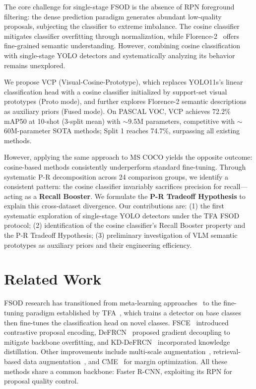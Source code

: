 \documentclass[conference]{IEEEtran}
\begin{document}
The core challenge for single-stage FSOD is the absence of RPN foreground filtering: the dense prediction paradigm generates abundant low-quality proposals, subjecting the classifier to extreme imbalance. The cosine classifier~\cite{wang2020tfa} mitigates classifier overfitting through normalization, while Florence-2~\cite{xiao2024florence2} offers fine-grained semantic understanding. However, combining cosine classification with single-stage YOLO detectors and systematically analyzing its behavior remains unexplored.

We propose VCP (Visual-Cosine-Prototype), which replaces YOLO11s's linear classification head with a cosine classifier initialized by support-set visual prototypes (Proto mode), and further explores Florence-2 semantic descriptions as auxiliary priors (Fused mode). On PASCAL VOC, VCP achieves 72.2\% mAP50 at 10-shot (3-split mean) with $\sim$9.5M parameters, competitive with $\sim$60M-parameter SOTA methods; Split 1 reaches 74.7\%, surpassing all existing methods.

However, applying the same approach to MS COCO yields the opposite outcome: cosine-based methods consistently underperform standard fine-tuning. Through systematic P-R decomposition across 24 comparison groups, we identify a consistent pattern: the cosine classifier invariably sacrifices precision for recall---acting as a \textbf{Recall Booster}. We formulate the \textbf{P-R Tradeoff Hypothesis} to explain this cross-dataset divergence. Our contributions are: (1) the first systematic exploration of single-stage YOLO detectors under the TFA FSOD protocol; (2) identification of the cosine classifier's Recall Booster property and the P-R Tradeoff Hypothesis; (3) preliminary investigation of VLM semantic prototypes as auxiliary priors and their engineering efficiency.

\section{Related Work}

FSOD research has transitioned from meta-learning approaches~\hl{\cite{huang2025prototype,gao2025decoupling}} to the fine-tuning paradigm established by TFA~\cite{wang2020tfa}, which trains a detector on base classes then fine-tunes the classification head on novel classes. FSCE~\cite{sun2021fsce} introduced contrastive proposal encoding, DeFRCN~\cite{qiao2021defrcn} proposed gradient decoupling to mitigate backbone overfitting, and KD-DeFRCN~\cite{pei2022kddefrcn} incorporated knowledge distillation. Other improvements include multi-scale augmentation~\hl{\cite{vu2025multiperspective}}, retrieval-based data augmentation~\hl{\cite{li2025domainrag}}, and CME~\cite{li2021cme} for margin optimization. All these methods share a common backbone: Faster R-CNN, exploiting its RPN for proposal quality control.
\end{document}
